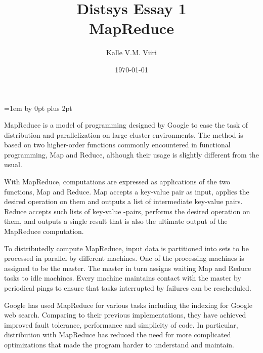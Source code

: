 \documentclass[12pt,a4paper,titlepage]{article}
\title{Distsys Essay 1 \\ MapReduce \vspace{0.5em}}
\author{Kalle V.M. Viiri}
\date{\today}
\begin{document}
\setcounter{page}{1}
\parskip=1em \advance\parskip by 0pt plus 2pt
\pagestyle{fancy}

\maketitle

MapReduce\cite{mapreduce} is a model of programming designed by Google to ease the task of distribution and parallelization on large cluster environments. The method is based on two higher-order functions commonly encountered in functional programming, Map and Reduce, although their usage is slightly different from the usual.

With MapReduce, computations are expressed as applications of the two functions, Map and Reduce. Map accepts a key-value pair as input, applies the desired operation on them and outputs a list of intermediate key-value pairs. Reduce accepts such lists of key-value -pairs, performs the desired operation on them, and outputs a single result that is also the ultimate output of the MapReduce computation.

To distributedly compute MapReduce, input data is partitioned into sets to be processed in parallel by different machines. One of the processing machines is assigned to be the master. The master in turn assigns waiting Map and Reduce tasks to idle machines. Every machine maintains contact with the master by periodical pings to ensure that tasks interrupted by failures can be rescheduled.

Google has used MapReduce for various tasks including the indexing for Google web search. Comparing to their previous implementations, they have achieved improved fault tolerance, performance and simplicity of code. In particular, distribution with MapReduce has reduced the need for more complicated optimizations that made the program harder to understand and maintain.



\end{document}
